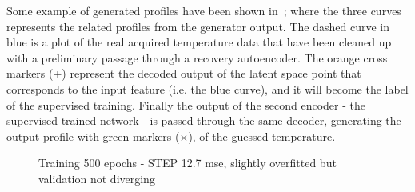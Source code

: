 Some example of generated profiles have been shown in~\Figure{\ref{fig:step_12_7_rec}}; where the three curves represents the related profiles from the generator output. The dashed curve in blue is a plot of the real acquired temperature data that have been cleaned up with a preliminary passage through a recovery autoencoder. The orange cross markers (+) represent the decoded output of the latent space point that corresponds to the input feature (i.e. the blue curve), and it will become the label of the supervised training. Finally the output of the second encoder - the supervised trained network - is passed through the same decoder, generating the output profile with green markers ($\times$), of the guessed temperature.
\begin{figure}
    \centering
    \caption{ Training 500 epochs - STEP 12.7 mse, slightly overfitted but validation not diverging }
    \label{fig:step_12_7_rec}
\end{figure}
